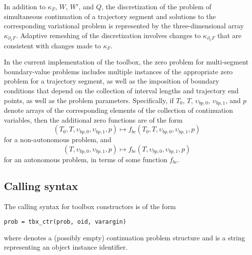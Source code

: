 In addition to $\kappa_F$, $W$, $W'$, and $Q$, the discretization of the problem of simultaneous continuation of a trajectory segment and solutions to the corresponding variational problem is represented by the three-dimensional array $\kappa_{\partial_x F}$. Adaptive remeshing of the discretization involves changes to $\kappa_{\partial_x F}$ that are consistent with changes made to $\kappa_F$.

In the current implementation of the  toolbox, the zero problem for multi-segment boundary-value problems includes multiple instances of the appropriate zero problem for a trajectory segment, as well as the imposition of boundary conditions that depend on the collection of interval lengths and trajectory end points, as well as the problem parameters. Specifically, if $T_0$, $T$, $\upsilon_{bp,0}$, $\upsilon_{bp,1}$, and $p$ denote arrays of the corresponding elements of the collection of continuation variables, then the additional zero functions are of the form
\begin{equation}
\left(T_0,T,\upsilon_{bp,0},\upsilon_{bp,1},p\right)\mapsto f_{bc}\left(T_0,T,\upsilon_{bp,0},\upsilon_{bp,1},p\right)
\end{equation}
for a non-autonomous problem, and
\begin{equation}
\left(T,\upsilon_{bp,0},\upsilon_{bp,1},p\right)\mapsto f_{bc}\left(T,\upsilon_{bp,0},\upsilon_{bp,1},p\right)
\end{equation}
for an autonomous problem, in terms of some function $f_{bc}$.

\subsection{Calling syntax}
The calling syntax for toolbox constructors is of the form
\begin{lstlisting}[language=coco-highlight]
prob = tbx_ctr(prob, oid, varargin)
\end{lstlisting}
where  denotes a (possibly empty) continuation problem structure and  is a string representing an object instance identifier.

